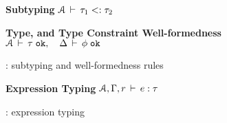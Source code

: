 \begin{figure*}[!ht]
%
\textbf{Subtyping}  \; \fbox
  {\({\mathcal{A}}\,\vdash\,\tau_1 <: \tau_2\)}\\

%
\bigskip

\textbf{Type, and Type Constraint Well-formedness}  \; \fbox
  {\({\mathcal{A}}\,\vdash\,\tau \; \texttt{ok}, \quad 
     \Delta\,\vdash\,\phi \; \texttt{ok}\)}\\

%
\bigskip


%

\caption{\fbname: subtyping and well-formedness rules}
\label{fig:fb-staticsem-1}
\end{figure*}

\begin{figure*}[!ht]
\textbf{Expression Typing}  \; \fbox
  {\({\mathcal{A}},\Gamma,r\,\vdash\,e:\tau\)}\\

\caption{\fbname: expression typing}
\label{fig:fb-staticsem-2}
\end{figure*}
